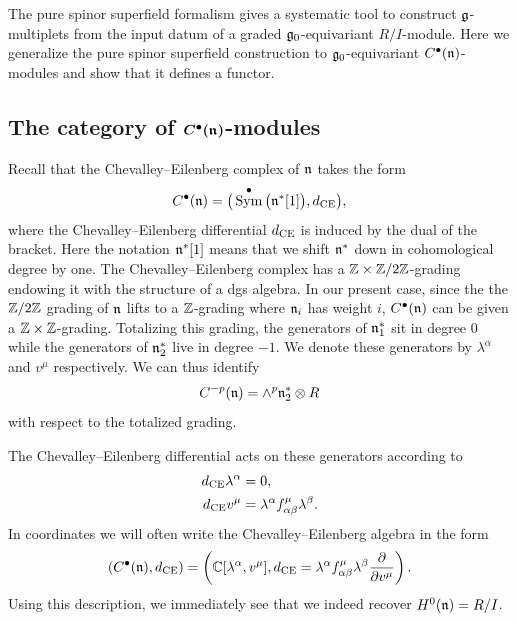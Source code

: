 \documentclass[11pt]{article}
\numberwithin{equation}{section}
\numberwithin{equation}{section}
\def\d{{\rm d}}
\DeclareMathOperator{\Sym}{Sym}
\begin{document}
The pure spinor superfield formalism gives a systematic tool to construct $\mathfrak g$-multiplets from the input datum of a graded $\mathfrak g_0$-equivariant $R/I$-module. Here we generalize the pure spinor superfield construction to $\mathfrak g_0$-equivariant $C^\bullet(\mathfrak n)$-modules and show that it defines a functor.


\subsection[The category of C\^{}bullet(n)-modules]{The category of $\boldsymbol{C^\bullet(\mathfrak n)}$-modules} \label{CE_module_section}
Recall that the Chevalley--Eilenberg complex of $\mathfrak n$ takes the form
\begin{equation*}
C^\bullet(\fn) = \big( \Sym^\bullet\big(\fn^*[1]\big) , \d_{\mathrm{CE}} \big),
\end{equation*}
where the Chevalley--Eilenberg differential $\d_{\mathrm{CE}}$ is induced by the dual of the bracket. Here the notation $\mathfrak n^*[1]$ means that we shift $\mathfrak n^*$ down in cohomological degree by one. The Chevalley--Eilenberg complex has a $\mathbb Z \times \mathbb Z/2\mathbb Z$-grading endowing it with the structure of a dgs algebra. In our present case, since the the $\mathbb Z/2\mathbb Z$ grading of $\mathfrak n$ lifts to a $\mathbb Z$-grading where $\mathfrak n_i$ has weight $i$, $C^\bullet(\mathfrak n)$ can be given a $\mathbb Z \times \mathbb Z$-grading. Totalizing this grading, the generators of $\mathfrak n_1^*$ sit in degree $0$ while the generators of $\mathfrak n_2^*$ live in degree $-1$. We denote these generators by $\lambda^\alpha$ and $v^\mu$ respectively. We can thus identify{\samepage
\begin{equation*}
C^{-p}(\mathfrak n) = \wedge^p \mathfrak n_2^* \otimes R
\end{equation*}
with respect to the totalized grading.}

The Chevalley--Eilenberg differential acts on these generators according to
\begin{equation*}
\begin{split}
\d_{\mathrm{CE}} \lambda^\alpha &= 0, \\
\d_{\mathrm{CE}} v^\mu &= \lambda^\alpha f^\mu_{\alpha \beta} \lambda^\beta.
\end{split}
\end{equation*}
In coordinates we will often write the Chevalley--Eilenberg algebra in the form
\begin{equation*}
\left( C^\bullet(\fn), \d_{\mathrm{CE}} \right) = \left( \CC[\lambda^\alpha ,v^\mu] , \d_{\mathrm{CE}} = \lambda^\alpha f^\mu_{\alpha \beta} \lambda^\beta \frac{\partial}{\partial v^\mu} \right) .
\end{equation*}
Using this description, we immediately see that we indeed recover $H^0(\mathfrak n) = R/I$.
\end{document}
